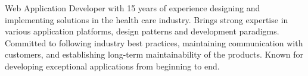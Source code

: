 

\begin{cvparagraph}

Web Application Developer with 15 years of experience designing and implementing solutions in the health care industry. Brings strong expertise in various application platforms, design patterns and development paradigms. Committed to following industry best practices, maintaining communication with customers, and establishing long-term maintainability of the products. Known for developing exceptional applications from beginning to end.
\end{cvparagraph}
